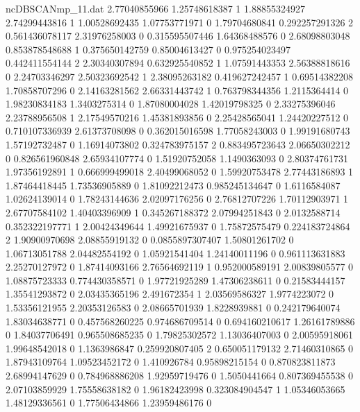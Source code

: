 \begin{filecontents}{ncDBSCANmp_11.dat}
2.77040855966 1.25748618387 1
1.88855324927 2.74299443816 1
1.00528692435 1.07753771971 0
1.79704680841 0.292257291326 2
0.561436078117 2.31976258003 0
0.315595507446 1.64368488576 0
2.68098803048 0.853878548688 1
0.375650142759 0.85004613427 0
0.975254023497 0.442411554144 2
2.30340307894 0.632925540852 1
1.07591443353 2.56388818616 0
2.24703346297 2.50323692542 1
2.38095263182 0.419627242457 1
0.69514382208 1.70858707296 0
2.14163281562 2.66331443742 1
0.763798344356 1.2115364414 0
1.98230834183 1.3403275314 0
1.87080004028 1.42019798325 0
2.33275396046 2.23788956508 1
2.17549570216 1.45381893856 0
2.25428565041 1.24420227512 0
0.710107336939 2.61373708098 0
0.362015016598 1.77058243003 0
1.99191680743 1.57192732487 0
1.16914073802 0.324783975157 2
0.883495723643 2.06650302212 0
0.826561960848 2.65934107774 0
1.51920752058 1.1490363093 0
2.80374761731 1.97356192891 1
0.666999499018 2.40499068052 0
1.59920753478 2.77443186893 1
1.87464418445 1.73536905889 0
1.81092212473 0.985245134647 0
1.6116584087 1.02624139014 0
1.78243144636 2.02097176256 0
2.76812707226 1.70112903971 1
2.67707584102 1.40403396909 1
0.345267188372 2.07994251843 0
2.0132588714 0.352322197771 1
2.00424349644 1.49921675937 0
1.75872575479 0.224183724864 2
1.90900970698 2.08855919132 0
0.0855897307407 1.50801261702 0
1.06713051788 2.04482554192 0
1.05921541404 1.24140011196 0
0.961113631883 2.25270127972 0
1.87414093166 2.76564692119 1
0.952000589191 2.00839805577 0
1.08875723333 0.774430358571 0
1.97721925289 1.47306238611 0
0.21583444157 1.35541293872 0
2.03435365196 2.491672354 1
2.03569586327 1.9774223072 0
1.53356121955 2.20353126583 0
2.08665701939 1.8228939881 0
0.242179640074 1.83034638771 0
0.457568260225 0.974686709514 0
0.694160210617 1.26161789886 0
1.84037706491 0.965508685235 0
1.79825302572 1.13036407003 0
2.00595918061 1.99648542018 0
1.1363986847 0.259920807405 2
0.650051179132 2.71460310865 0
1.87943109764 1.09523452172 0
1.410926784 0.95898215154 0
0.870823811873 2.68994147629 0
0.784968886208 1.92959719476 0
1.5050441664 0.807369455538 0
2.07103859929 1.75558638182 0
1.96182423998 0.323084904547 1
1.05346053665 1.48129336561 0
1.77506434866 1.23959486176 0
\end{filecontents}